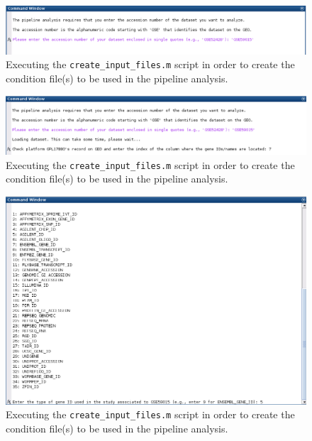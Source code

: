 \documentclass[final,letterpaper,twoside,12pt]{article}
\begin{document}
\begin{figure}[h]
\includegraphics[width=\textwidth]{create_files_2}
\caption{Executing the \texttt{create\_input\_files.m} script in order to create the condition file(s) to be used in the pipeline analysis.}
\label{figure:create_files_2}
\end{figure}

\begin{figure}[h]
\includegraphics[width=\textwidth]{create_files_3}
\caption{Executing the \texttt{create\_input\_files.m} script in order to create the condition file(s) to be used in the pipeline analysis.}
\label{figure:create_files_3}
\end{figure}

\begin{figure}[h]
\includegraphics[width=\textwidth]{create_files_4}
\caption{Executing the \texttt{create\_input\_files.m} script in order to create the condition file(s) to be used in the pipeline analysis.}
\label{figure:create_files_4}
\end{figure}
\end{document}
